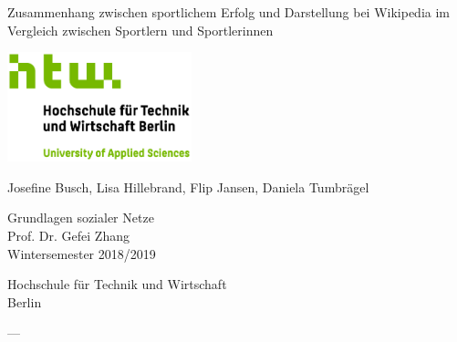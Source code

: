 \documentclass[11pt]{article}
\renewenvironment{abstract}
{{\bfseries\noindent{\abstractname}\par\nobreak}\footnotesize}
{\bigskip}
\begin{document}
\begin{titlepage}
   \begin{center}
       \vspace*{1cm}
       
       \Huge	
       Zusammenhang zwischen sportlichem Erfolg und Darstellung bei Wikipedia im Vergleich zwischen Sportlern und Sportlerinnen
 
       \vspace{2.0cm}
       
       \includegraphics[width=0.4\textwidth]{logo.jpg}
 
       \vspace{1.5cm}
       \LARGE
       Josefine Busch, Lisa Hillebrand, Flip Jansen, Daniela Tumbrägel
 
       \vfill
 
       Grundlagen sozialer Netze \\
       Prof. Dr. Gefei Zhang\\
       Wintersemester 2018/2019\\
 
       \vspace{0.8cm}
      
       Hochschule für Technik und Wirtschaft\\
       Berlin\\
 
   \end{center}
\end{titlepage}



\author{Lisa Hillebrand}%
\author{Josefine Sophie Busch}%
\author{Daniela Tumbrägel}%
\author{Flip Jansen}%
%





\pagebreak

\begin{abstract}
\textbf{}---%
\end{abstract}%
\end{document}
